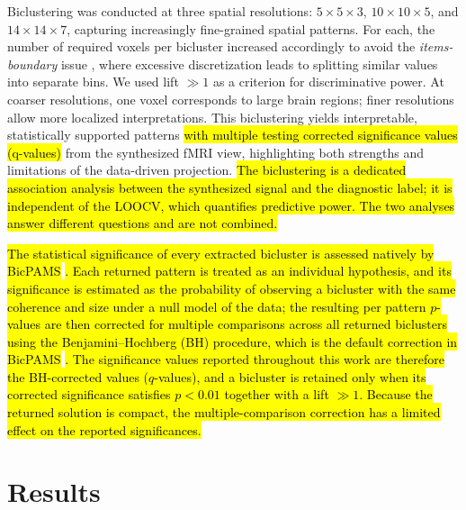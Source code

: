 \documentclass{article}
\begin{document}
Biclustering was conducted at three spatial resolutions: $5\times5\times3$, $10\times10\times5$, and $14\times14\times7$, capturing increasingly fine-grained spatial patterns. For each, the number of required voxels per bicluster increased accordingly to avoid the \textit{items-boundary} issue \cite{henriques2014bicpam}, where excessive discretization leads to splitting similar values into separate bins. We used lift $\gg 1$ as a criterion for discriminative power. At coarser resolutions, one voxel corresponds to large brain regions; finer resolutions allow more localized interpretations. This biclustering yields interpretable, statistically supported patterns \hl{with multiple testing corrected significance values (q-values)} from the synthesized fMRI view, highlighting both strengths and limitations of the data-driven projection. \hl{The biclustering is a dedicated association analysis between the synthesized signal and the diagnostic label; it is independent of the LOOCV, which quantifies predictive power. The two analyses answer different questions and are not combined.}

\hl{The statistical significance of every extracted bicluster is assessed natively by BicPAMS }\cite{henriques2017bicpams}\hl{. Each returned pattern is treated as an individual hypothesis, and its significance is estimated as the probability of observing a bicluster with the same coherence and size under a null model of the data; the resulting per pattern $p$-values are then corrected for multiple comparisons across all returned biclusters using the Benjamini--Hochberg (BH) procedure, which is the default correction in BicPAMS }\cite{henriques2017bicpams}\hl{. The significance values reported throughout this work are therefore the BH-corrected values ($q$-values), and a bicluster is retained only when its corrected significance satisfies $p < 0.01$ together with a lift $\gg 1$. Because the returned solution is compact, the multiple-comparison correction has a limited effect on the reported significances.}

\section{Results}\label{section:results}
\end{document}
